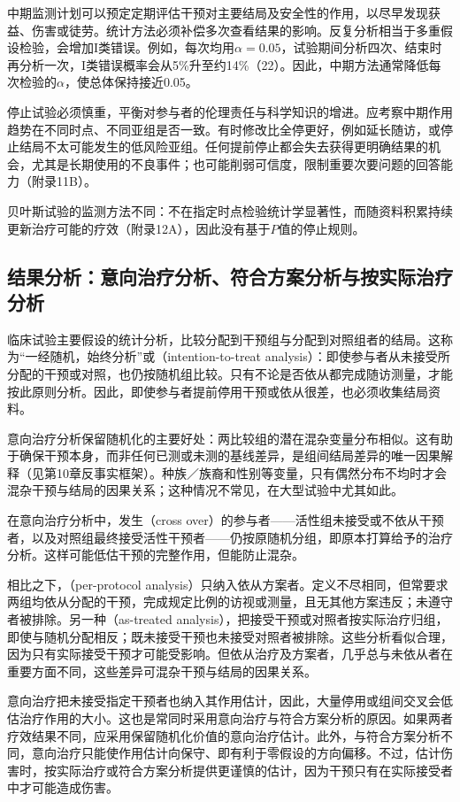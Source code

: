 中期监测计划可以预定定期评估干预对主要结局及安全性的作用，以尽早发现获益、伤害或徒劳。统计方法必须补偿多次查看结果的影响。反复分析相当于多重假设检验，会增加I类错误。例如，每次均用$\alpha=0.05$，试验期间分析四次、结束时再分析一次，I类错误概率会从5\%升至约14\%（22）。因此，中期方法通常降低每次检验的$\alpha$，使总体保持接近0.05。

停止试验必须慎重，平衡对参与者的伦理责任与科学知识的增进。应考察中期作用趋势在不同时点、不同亚组是否一致。有时修改比全停更好，例如延长随访，或停止结局不太可能发生的低风险亚组。任何提前停止都会失去获得更明确结果的机会，尤其是长期使用的不良事件；也可能削弱可信度，限制重要次要问题的回答能力（附录11B）。

贝叶斯试验的监测方法不同：不在指定时点检验统计学显著性，而随资料积累持续更新治疗可能的疗效（附录12A），因此没有基于$P$值的停止规则。

\subsection{结果分析：意向治疗分析、符合方案分析与按实际治疗分析}
临床试验主要假设的统计分析，比较分配到干预组与分配到对照组者的结局。这称为“一经随机，始终分析”或（intention-to-treat analysis）：即使参与者从未接受所分配的干预或对照，也仍按随机组比较。只有不论是否依从都完成随访测量，才能按此原则分析。因此，即使参与者提前停用干预或依从很差，也必须收集结局资料。

意向治疗分析保留随机化的主要好处：两比较组的潜在混杂变量分布相似。这有助于确保干预本身，而非任何已测或未测的基线差异，是组间结局差异的唯一因果解释（见第10章反事实框架）。种族／族裔和性别等变量，只有偶然分布不均时才会混杂干预与结局的因果关系；这种情况不常见，在大型试验中尤其如此。

在意向治疗分析中，发生（cross over）的参与者——活性组未接受或不依从干预者，以及对照组最终接受活性干预者——仍按原随机分组，即原本打算给予的治疗分析。这样可能低估干预的完整作用，但能防止混杂。

相比之下，（per-protocol analysis）只纳入依从方案者。定义不尽相同，但常要求两组均依从分配的干预，完成规定比例的访视或测量，且无其他方案违反；未遵守者被排除。另一种（as-treated analysis），把接受干预或对照者按实际治疗归组，即使与随机分配相反；既未接受干预也未接受对照者被排除。这些分析看似合理，因为只有实际接受干预才可能受影响。但依从治疗及方案者，几乎总与未依从者在重要方面不同，这些差异可混杂干预与结局的因果关系。

意向治疗把未接受指定干预者也纳入其作用估计，因此，大量停用或组间交叉会低估治疗作用的大小。这也是常同时采用意向治疗与符合方案分析的原因。如果两者疗效结果不同，应采用保留随机化价值的意向治疗估计。此外，与符合方案分析不同，意向治疗只能使作用估计向保守、即有利于零假设的方向偏移。不过，估计伤害时，按实际治疗或符合方案分析提供更谨慎的估计，因为干预只有在实际接受者中才可能造成伤害。

